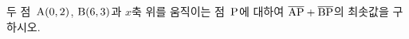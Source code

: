 두 점~$\mathrm{A}(0{,}\mkern3mu\mathopen{}2)$, $\mathrm{B}(6{,}\mkern3mu\mathopen{}3)$과 $x$축 위를 움직이는 점~$\mathrm{P}$에 대하여 $\overline{\mathrm{AP}}+\overline{\mathrm{BP}}$의 최솟값을 구하시오.
